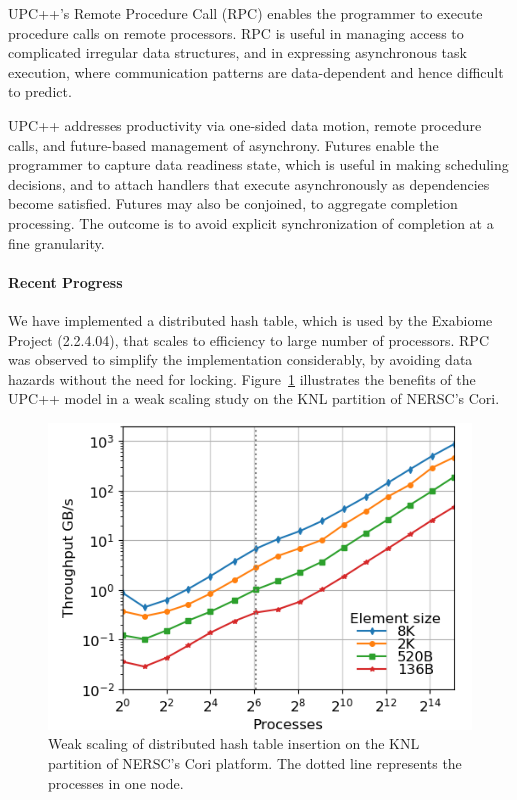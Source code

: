 UPC++'s Remote Procedure Call (RPC)
enables the programmer
to execute procedure calls on remote processors.
RPC is useful in managing access to complicated irregular data structures,
and in expressing asynchronous task execution, where communication patterns
are data-dependent and hence difficult to predict.

UPC++ addresses productivity via one-sided data motion, remote procedure calls,
and future-based management of asynchrony.
Futures enable the programmer
to capture data readiness state,
which is useful in making scheduling decisions,
and to attach handlers that 
execute asynchronously as dependencies become
satisfied. Futures may also be conjoined, to aggregate
completion processing. The outcome is to avoid explicit synchronization of completion at a fine granularity.



\paragraph{Recent Progress}

We have implemented a distributed hash table,
which is used by the Exabiome Project (2.2.4.04), that scales to efficiency
to large number of processors. RPC was observed to simplify the implementation
considerably, by avoiding data hazards without the need for locking.
Figure~\ref{fig:dht} illustrates the benefits of the UPC++ model 
in a weak scaling study on the KNL partition of NERSC's Cori.




\begin{figure}[htb]
\centering
      \includegraphics{projects/2.3.1-PMR/2.3.1.14-UPCxx-GASNet/all-cori-knl-out-inserts-wait.png}
  \caption{Weak scaling of distributed hash table insertion on the KNL partition of NERSC's Cori platform. The dotted line represents the processes in one node.\vspace{-.4cm}}
  \label{fig:dht}
\end{figure}



